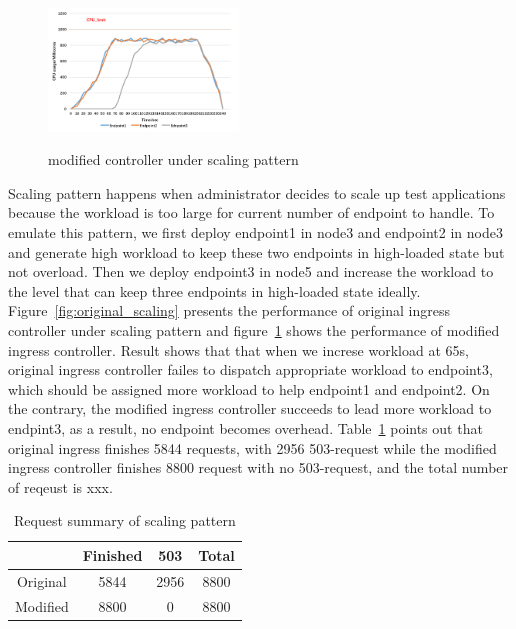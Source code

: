\begin{figure}[!htb]
 \centering
 \includegraphics[width=0.45\textwidth]{images/data4.png}\\
 \caption{modified controller under scaling pattern}
 \label{fig:modified_scaling}
\end{figure}
Scaling pattern happens when administrator decides to scale up test applications because the workload is too large for current number of endpoint to handle. To emulate this pattern, we first deploy endpoint1 in node3 and endpoint2 in node3 and generate high workload to keep these two endpoints in high-loaded state but not overload. Then we deploy endpoint3 in node5 and increase the workload to the level that can keep three endpoints in high-loaded state ideally. Figure~{\ref{fig:original_scaling}} presents the performance of original ingress controller under scaling pattern and figure~{\ref{fig:modified_scaling}} shows the performance of modified ingress controller. Result shows that that when we increse workload at 65s, original ingress controller failes to dispatch appropriate workload to endpoint3, which should be assigned more workload to help endpoint1 and endpoint2. On the contrary, the modified ingress controller succeeds to lead more workload to endpint3, as a result, no endpoint becomes overhead. Table~{\ref{table:request_summary2}} points out that original ingress finishes 5844 requests, with 2956 503-request while the modified ingress controller finishes 8800 request with no 503-request, and the total number of reqeust is xxx.
\hspace{0pt}
\begin{table}[htbp]
 \begin{center}
  \begin{tabular}{c|c|c|c}
   \hline
            & Finished & 503  & Total \\  \hline
   Original & 5844     & 2956 & 8800  \\ \hline
   Modified & 8800     & 0    & 8800  \\ \hline
  \end{tabular}
 \end{center}
 \caption{Request summary of scaling pattern}
 \label{table:request_summary2}
\end{table}

